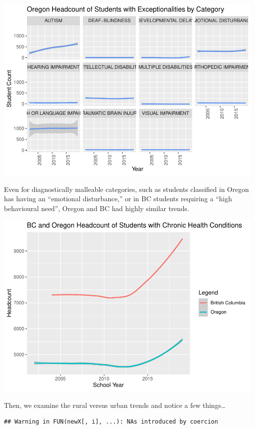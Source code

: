 \documentclass[
  english,
  man]{apa6}
\begin{document}
\includegraphics{Final_project_files/figure-latex/unnamed-chunk-1-1.pdf}

Even for diagnostically malleable categories, such as students classified in Oregon has having an \enquote{emotional disturbance,} or in BC students requiring a \enquote{high behavioural need}, Oregon and BC had highly similar trends.

\includegraphics{Final_project_files/figure-latex/BCOR combo-1.pdf}

Then, we examine the rural versus urban trends and notice a few things\ldots{}

\begin{verbatim}
## Warning in FUN(newX[, i], ...): NAs introduced by coercion
\end{verbatim}
\end{document}
